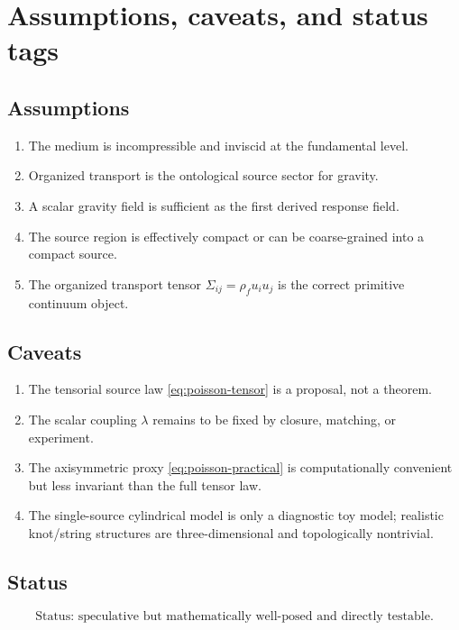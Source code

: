\documentclass[11pt]{article}
\newcommand{\rhoF}{\rho_{\!f}}
\begin{document}
        \section{Assumptions, caveats, and status tags}
        
        \subsection{Assumptions}
            \begin{enumerate}[label=(A\arabic*)]
\item The medium is incompressible and inviscid at the fundamental level.
\item Organized transport is the ontological source sector for gravity.
\item A scalar gravity field is sufficient as the first derived response field.
\item The source region is effectively compact or can be coarse-grained into a compact source.
\item The organized transport tensor \(\Sigma_{ij}=\rhoF u_i u_j\) is the correct primitive continuum object.
            \end{enumerate}
        
        \subsection{Caveats}
            \begin{enumerate}[label=(C\arabic*)]
\item The tensorial source law \eqref{eq:poisson-tensor} is a proposal, not a theorem.
\item The scalar coupling \(\lambda\) remains to be fixed by closure, matching, or experiment.
\item The axisymmetric proxy \eqref{eq:poisson-practical} is computationally convenient but less invariant than the full tensor law.
\item The single-source cylindrical model is only a diagnostic toy model; realistic knot/string structures are three-dimensional and topologically nontrivial.
            \end{enumerate}
        
        \subsection{Status}
            \begin{equation}
                \boxed{
                    \text{Status: speculative but mathematically well-posed and directly testable.}
                }
            \end{equation}
        
\end{document}
